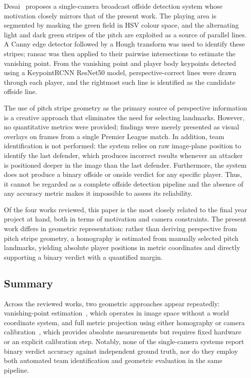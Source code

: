 Desai~\cite{desai2025realtime} proposes a single-camera broadcast offside detection system whose motivation closely mirrors that of the present work. The playing area is segmented by masking the green field in HSV colour space, and the alternating light and dark green stripes of the pitch are exploited as a source of parallel lines. A Canny edge detector followed by a Hough transform was used to identify these stripes; \gls{ransac} was then applied to their pairwise intersections to estimate the vanishing point. From the vanishing point and player body keypoints detected using a KeypointRCNN ResNet50 model, perspective-correct lines were drawn through each player, and the rightmost such line is identified as the candidate offside line.

The use of pitch stripe geometry as the primary source of perspective information is a creative approach that eliminates the need for selecting landmarks. However, no quantitative metrics were provided; findings were merely presented as visual overlays on frames from a single Premier League match. In addition, team identification is not performed: the system relies on raw image-plane position to identify the last defender, which produces incorrect results whenever an attacker is positioned deeper in the image than the last defender. Furthermore, the system does not produce a binary offside or onside verdict for any specific player. Thus, it cannot be regarded as a complete offside detection pipeline and the absence of any accuracy metric makes it impossible to assess its reliability.

Of the four works reviewed, this paper is the most closely related to the final year project at hand, both in terms of motivation and camera constraints. The present work differs in geometric representation: rather than deriving perspective from pitch stripe geometry, a homography is estimated from manually selected pitch landmarks, yielding absolute player positions in metric coordinates and directly supporting a binary verdict with a quantified margin.

\subsection{Summary}%
\label{sec:lit_summary}

Across the reviewed works, two geometric approaches appear repeatedly: vanishing-point estimation~\cite{muthuraman2018vision,panse2020dataset,desai2025realtime}, which operates in image space without a world coordinate system, and full metric projection using either homography or camera calibration~\cite{uchida2021offside}, which provides absolute measurements but requires fixed hardware or an explicit calibration step. Notably, none of the single-camera systems report binary verdict accuracy against independent ground truth, nor do they employ both automated team identification and geometric evaluation in the same pipeline.

